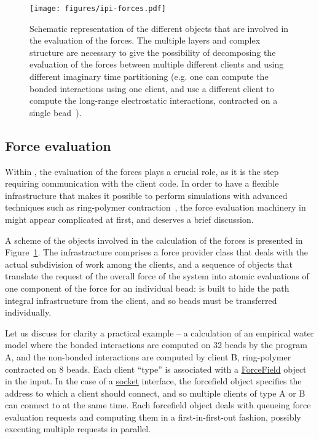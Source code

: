 \documentclass[11pt,english,fleqn]{report}
\begin{document}
\begin{figure}[hpbt]
\centering\texttt{[image: figures/ipi-forces.pdf]}
\caption{\label{fig:forces} Schematic representation of the different objects
that are involved in the evaluation of the forces. The multiple layers and complex
structure are necessary to give the possibility of decomposing the evaluation 
of the forces between multiple different clients and using different imaginary
time partitioning (e.g. one can compute the bonded interactions using one client,
and use a different client to compute the long-range electrostatic interactions,
contracted on a single bead~\cite{mark-mano08jcp}). 
}
\end{figure}


\subsection{Force evaluation}

Within \ipi{}, the evaluation of the forces plays a crucial role, 
as it is the step requiring communication with the client code. 
In order to have a flexible infrastructure that makes it possible
to perform simulations with advanced techniques such as ring-polymer
contraction~\cite{mark-mano08jcp}, the force evaluation machinery
in \ipi{} might appear complicated at first, and deserves a brief
discussion.

A scheme of the objects involved in the calculation of the forces
is presented in Figure~\ref{fig:forces}. The infrastracture comprises
a force provider class that deals with the actual subdivision of 
work among the clients, and a sequence of objects that translate
the request of the overall force of the system into atomic 
evaluations of one component of the force for an individual bead:
\ipi{} is built to hide the path integral infrastructure from the client, and so 
beads must be transferred individually.

Let us discuss for clarity a practical example -- a calculation 
of an empirical water model where the bonded interactions are 
computed on 32 beads by the program A, and the non-bonded interactions
are computed by client B, ring-polymer contracted on 8 beads.
Each client ``type'' is associated with a \hyperref[FORCEFIELD]{ForceField} 
object in the input. In the case of a \hyperref[FFSOCKET]{socket} interface,
the forcefield object specifies the address to which a client should connect,
and so multiple clients of type A or B can connect to \ipi{} at the same time.
Each forcefield object deals with queueing force evaluation requests
and computing them in a first-in-first-out fashion, possibly executing 
multiple requests in parallel. 
\end{document}
